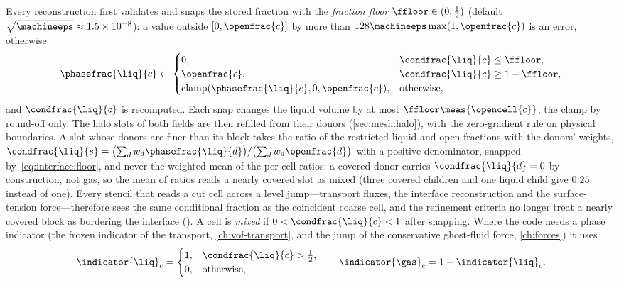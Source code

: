 Every reconstruction first validates and snaps the stored fraction with the
\emph{fraction floor} $\ffloor\in(0,\half)$ (default $\sqrt{\machineeps}\approx1.5\times10^{-8}$):
a value outside $[0,\openfrac{c}]$ by more than $128\machineeps\max(1,\openfrac{c})$
is an error, otherwise
\begin{equation}\label{eq:interface:floor}
  \phasefrac{\liq}{c}\leftarrow\begin{cases}
    0, & \condfrac{\liq}{c}\le\ffloor,\\
    \openfrac{c}, & \condfrac{\liq}{c}\ge1-\ffloor,\\
    \operatorname{clamp}(\phasefrac{\liq}{c},0,\openfrac{c}), & \text{otherwise},
  \end{cases}
\end{equation}
and $\condfrac{\liq}{c}$ is recomputed. Each snap changes the liquid volume by
at most $\ffloor\meas{\opencell{c}}$, the clamp by round-off only. The halo
slots of both fields are then refilled from their donors
(\cref{sec:mesh:halo}), with the zero-gradient rule on physical boundaries. A
slot whose donors are finer than its block takes the ratio of the restricted
liquid and open fractions with the donors' weights,
$\condfrac{\liq}{s}=\bigl(\sum_d w_d\phasefrac{\liq}{d}\bigr)/\bigl(\sum_d w_d\openfrac{d}\bigr)$
with a positive denominator, snapped by~\cref{eq:interface:floor}, and never
the weighted mean of the per-cell ratios: a covered donor carries
$\condfrac{\liq}{d}=0$ by construction, not gas, so the mean of ratios reads a
nearly covered slot as mixed (three covered children and one liquid child give
$0.25$ instead of one). Every stencil that reads a cut cell across a level
jump---transport fluxes, the interface reconstruction and the surface-tension
force---therefore sees the same conditional fraction as the coincident coarse
cell, and the refinement criteria no longer treat a nearly covered block as
bordering the interface (). A cell is
\emph{mixed} if $0<\condfrac{\liq}{c}<1$ after snapping. Where the code needs a
phase indicator (the frozen indicator of the transport,
\cref{ch:vof-transport}, and the jump of the conservative ghost-fluid force,
\cref{ch:forces}) it uses
\begin{equation}\label{eq:interface:indicator}
  \indicator{\liq}_c=\begin{cases}1, & \condfrac{\liq}{c}>\half,\\ 0, & \text{otherwise},\end{cases}
  \qquad \indicator{\gas}_c=1-\indicator{\liq}_c .
\end{equation}

